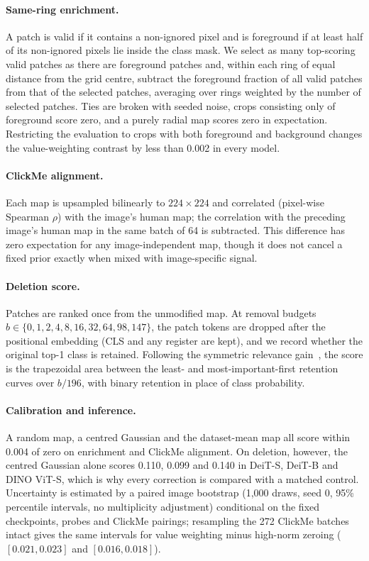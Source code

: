 \paragraph{Same-ring enrichment.} A patch is valid if it contains a non-ignored pixel and is foreground if at least half of its non-ignored pixels lie inside the class mask. We select as many top-scoring valid patches as there are foreground patches and, within each ring of equal distance from the grid centre, subtract the foreground fraction of all valid patches from that of the selected patches, averaging over rings weighted by the number of selected patches. Ties are broken with seeded noise, crops consisting only of foreground score zero, and a purely radial map scores zero in expectation. Restricting the evaluation to crops with both foreground and background changes the value-weighting contrast by less than 0.002 in every model.

\paragraph{ClickMe alignment.} Each map is upsampled bilinearly to $224{\times}224$ and correlated (pixel-wise Spearman $\rho$) with the image's human map; the correlation with the preceding image's human map in the same batch of 64 is subtracted. This difference has zero expectation for any image-independent map, though it does not cancel a fixed prior exactly when mixed with image-specific signal.

\paragraph{Deletion score.} Patches are ranked once from the unmodified map. At removal budgets $b\in\{0,1,2,4,8,16,32,64,98,147\}$, the patch tokens are dropped after the positional embedding (CLS and any register are kept), and we record whether the original top-1 class is retained. Following the symmetric relevance gain~\citep{bluecher2024}, the score is the trapezoidal area between the least- and most-important-first retention curves over $b/196$, with binary retention in place of class probability.

\paragraph{Calibration and inference.} A random map, a centred Gaussian and the dataset-mean map all score within 0.004 of zero on enrichment and ClickMe alignment. On deletion, however, the centred Gaussian alone scores 0.110, 0.099 and 0.140 in DeiT-S, DeiT-B and DINO ViT-S, which is why every correction is compared with a matched control. Uncertainty is estimated by a paired image bootstrap (1,000 draws, seed 0, 95\% percentile intervals, no multiplicity adjustment) conditional on the fixed checkpoints, probes and ClickMe pairings; resampling the 272 ClickMe batches intact gives the same intervals for value weighting minus high-norm zeroing ($[0.021, 0.023]$ and $[0.016, 0.018]$).

